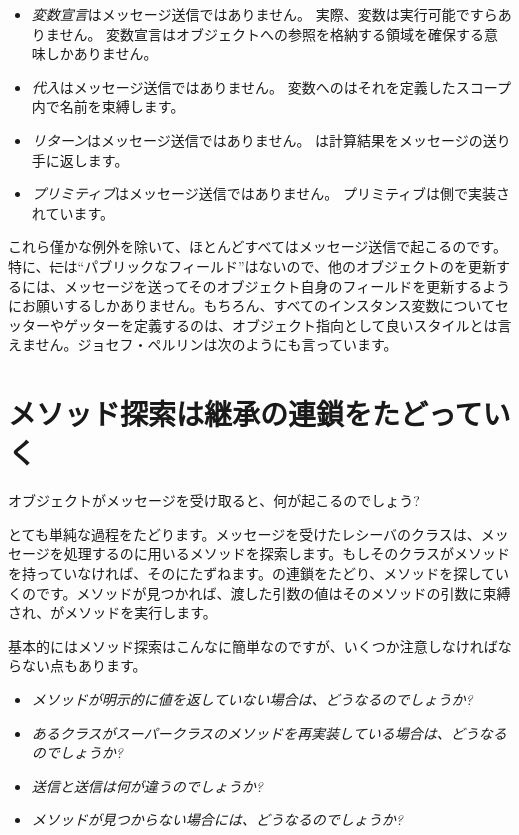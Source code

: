 \documentclass[a4paper,10pt,twoside]{book}
\begin{document}
\begin{itemize}
  \item \emph{変数宣言}はメッセージ送信ではありません。
		実際、変数は実行可能ですらありません。
		変数宣言はオブジェクトへの参照を格納する領域を確保する意味しかありません。
  \item \emph{代入}はメッセージ送信ではありません。
		変数へのはそれを定義したスコープ内で名前を束縛します。
  \item \emph{リターン}はメッセージ送信ではありません。
		は計算結果をメッセージの送り手に返します。
  \item \emph{プリミティブ}はメッセージ送信ではありません。
		プリミティブは側で実装されています。
\end{itemize}
これら僅かな例外を除いて、ほとんどすべてはメッセージ送信で起こるのです。特に、\st には``パブリックなフィールド''はないので、他のオブジェクトのを更新するには、メッセージを送ってそのオブジェクト自身のフィールドを更新するようにお願いするしかありません。もちろん、すべてのインスタンス変数についてセッターやゲッターを定義するのは、オブジェクト指向として良いスタイルとは言えません。ジョセフ・ペルリンは次のようにも言っています。

\section{メソッド探索は継承の連鎖をたどっていく}


オブジェクトがメッセージを受け取ると、何が起こるのでしょう?

とても単純な過程をたどります。メッセージを受けたレシーバのクラスは、メッセージを処理するのに用いるメソッドを探索します。もしそのクラスがメソッドを持っていなければ、そのにたずねます。の連鎖をたどり、メソッドを探していくのです。メソッドが見つかれば、渡した引数の値はそのメソッドの引数に束縛され、がメソッドを実行します。

基本的にはメソッド探索はこんなに簡単なのですが、いくつか注意しなければならない点もあります。

\begin{itemize}
  \item \emph{メソッドが明示的に値を返していない場合は、どうなるのでしょうか?}
  \item \emph{あるクラスがスーパークラスのメソッドを再実装している場合は、どうなるのでしょうか?}
  \item \emph{送信と送信は何が違うのでしょうか?}
  \item \emph{メソッドが見つからない場合には、どうなるのでしょうか?}
\end{itemize}
\end{document}
